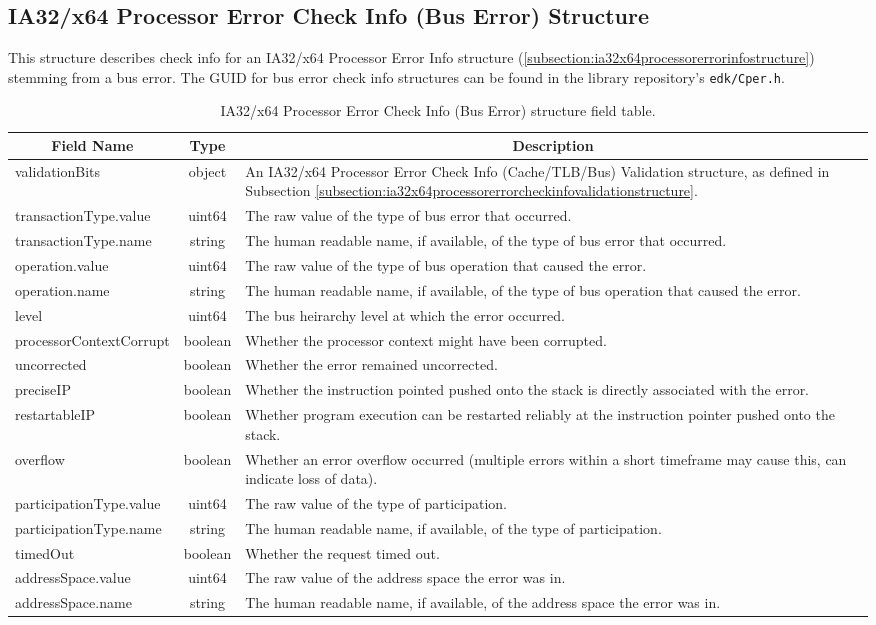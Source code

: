 \documentclass{report}
\newcommand*{\thead}[1]{\multicolumn{1}{|c|}{\bfseries #1}}
\newcommand*{\jsontable}[1]{
    \begin{table}[!ht]
    \label{#1}
    \centering
    \begin{adjustbox}{center}
    \begin{tabular}{|l|c|p{8cm}|}
    \hline
    \thead{Field Name} & \thead{Type} & \thead{Description} \\
    \hline
}
\newcommand*{\jsontableend}[1]{
    \hline
    \end{tabular}
    \end{adjustbox}
    \caption{#1}
    \label{table:#1}
    \end{table}
    \FloatBarrier
}
\begin{document}
\subsection{IA32/x64 Processor Error Check Info (Bus Error) Structure}
\label{subsection:ia32x64processorerrorcheckinfobusstructure}
This structure describes check info for an IA32/x64 Processor Error Info structure (\ref{subsection:ia32x64processorerrorinfostructure}) stemming from a bus error.
The GUID for bus error check info structures can be found in the library repository's \texttt{edk/Cper.h}.
\jsontable{table:ia32x64processorerrorcheckinfobusstructure}
validationBits & object & An IA32/x64 Processor Error Check Info (Cache/TLB/Bus) Validation structure, as defined in Subsection \ref{subsection:ia32x64processorerrorcheckinfovalidationstructure}.\\
\hline
transactionType.value & uint64 & The raw value of the type of bus error that occurred.\\
transactionType.name & string & The human readable name, if available, of the type of bus error that occurred.\\
\hline
operation.value & uint64 & The raw value of the type of bus operation that caused the error.\\
operation.name & string & The human readable name, if available, of the type of bus operation that caused the error.\\
\hline
level & uint64 & The bus heirarchy level at which the error occurred.\\
\hline
processorContextCorrupt & boolean & Whether the processor context might have been corrupted.\\
\hline
uncorrected & boolean & Whether the error remained uncorrected.\\
\hline
preciseIP & boolean & Whether the instruction pointed pushed onto the stack is directly associated with the error.\\
\hline
restartableIP & boolean & Whether program execution can be restarted reliably at the instruction pointer pushed onto the stack.\\
\hline
overflow & boolean & Whether an error overflow occurred (multiple errors within a short timeframe may cause this, can indicate loss of data).\\
\hline
participationType.value & uint64 & The raw value of the type of participation.\\
participationType.name & string & The human readable name, if available, of the type of participation.\\
\hline
timedOut & boolean & Whether the request timed out.\\
\hline
addressSpace.value & uint64 & The raw value of the address space the error was in.\\
addressSpace.name  & string & The human readable name, if available, of the address space the error was in.\\
\jsontableend{IA32/x64 Processor Error Check Info (Bus Error) structure field table.}
\end{document}
